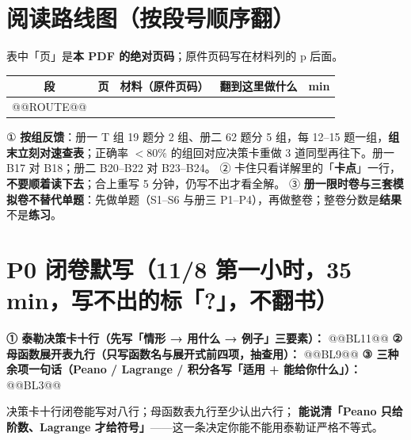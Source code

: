 \section{阅读路线图（按段号顺序翻）}
{\small 表中「页」是\textbf{本 PDF 的绝对页码}；原件页码写在材料列的 p 后面。}
\footnotesize
\setlength{\tabcolsep}{2pt}
\renewcommand{\arraystretch}{0.86}
\begin{longtable}{c|c|p{4.5cm}|p{6.6cm}|c}
\toprule
段 & 页 & 材料（原件页码） & 翻到这里做什么 & min \\
\midrule
\endhead
@@ROUTE@@
\bottomrule
\end{longtable}
\normalsize
\begin{keypoint}[路线图的三条纪律]
① \textbf{按组反馈}：册一 T 组 19 题分 2 组、册二 62 题分 5 组，每 12--15 题一组，\textbf{组末立刻对速查表}；正确率 $<80\%$ 的组回对应决策卡重做 3 道同型再往下。册一 B17 对 B18；册二 B20--B22 对 B23--B24。
② 卡住只看详解里的「\textbf{卡点}」一行，\textbf{不要顺着读下去}；合上重写 5 分钟，仍写不出才看全解。
③ \textbf{册一限时卷与三套模拟卷不替代单题}：先做单题（S1--S6 与册三 P1--P4），再做整卷；整卷分数是\textbf{结果}不是\textbf{练习}。
\end{keypoint}
\section{P0 闭卷默写（11/8 第一小时，35 min，写不出的标「?」，不翻书）}
\textbf{① 泰勒决策卡十行（先写「情形 → 用什么 → 例子」三要素）：}
@@BL11@@
\textbf{② 母函数展开表九行（只写函数名与展开式前四项，抽查用）：}
@@BL9@@
\textbf{③ 三种余项一句话（Peano / Lagrange / 积分各写「适用 + 能给你什么」）：}
@@BL3@@
\begin{keypoint}[验收]
决策卡十行闭卷能写对八行；母函数表九行至少认出六行；
\textbf{能说清「Peano 只给阶数、Lagrange 才给符号」}——这一条决定你能不能用泰勒证严格不等式。
\end{keypoint}
